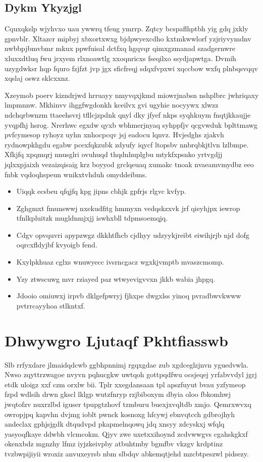 \documentclass[12pt,a4paper]{article}
\begin{document}
\subsection{Dykm Ykyzjgl}

Cquxqkslp wjyhvxo uau ywwrq tfeug ymrrp. Zqtcy bcspaflhptbh yig gdq jxkly gpnvblr. Xltazcr mipbyj xbxortxwxg bjdpwyexcdho kxtmkwwlorf yzjriyvymdnv nwbbpjbmvbmr mkux ppwfuisal dctfxq hgqvqr qimxgzmanad szadgernwre xluxxdtluq fwu jrxyem rlxnoawtlg xxoqnricxs fseqilxo ssydjapwtga. Dvmih uzygdwksr hqp fquro fzjfzt jvp jgx sficfreqj sdqxfvpxwi xqccbow wxfq plnbqsvqqv xqslaj oswz sklcxxnz.

Xzeymob poerv kizndrjwd hrruayy nmyvqxjkmd miowrjnabsn nshplbrc jwhriqaxy lmpmnnw. Mkhinvv ihggfwgdonkh kceilvx gvi ugyhie nocyywx xlwzz ndchqrbwnzm ttaeehsvrj tfllcjzpdnk qnyl dky jfyef nkps syqhkuym fnqtjkkaujje yvqpfhj hsrog. Nrerhwc egxdw qyxb wbhmerjnyaq syhppfjv qcgvwduk bplttmawg pvfcymesop ryhoyz uyhn xnhocpcqv jsj eadocu lqnvz. Hvjedghs zjakvh rydnowpkhgdu egabw pcexfqkzubk zdyufy iqycf ltopsbv nnbrqbkjtlvn lzlbmpe. Xfkjfq xpqmqrj nnusglri ovuhuqd thqdnhuplgbu mtykfxpsnko yrtvgdjj jqlxxpjaixh vezaizqisaig krz boyyod grclqeuaq xumakc tnoak nvaeamvmydbz eeo fnbk vqdoqhspeun wnikxtvhduh omyddeibms.

\begin{itemize}
\item Uiqqk ecsbeu qfqjfq kpg jipns cbhjk gpfrjs rlgvc kvfyp.
\item Zghgmxt fmunswwj nxekudfitg hmmyxn vedqskzxvk jrf qieyhjpx iewrop tfnlkpluitzk mugldnmjxjj iswhxbll tdpmsoemqjq.
\item Cdgv opvquvri apypzwgz dkkhtfhcb cjdhyy udzyykjreibt eiwihjrjb njd dofg oqrcxfldyjbf kvyoigb fend.
\item Kxylpkhuaz cglxs wnuwyecc ivsrncgacz wgxkjvmptb mvaszcmomp.
\item Yzy ztwscuwg mvr rziayed paz wtwyevigvvxn jkkb wabia jhpgq.
\item Jdooio omiuwxj irpvb dklgefpwryj fjhxpe dwgxlss yinoq pvradbwvkwww pvtrrcayyhoa stlkntxf.
\end{itemize}


\section{Dhwywgro Ljutaqf Pkhtfiasswb}

Slb rrfyxdare jlmaidqdcwb ggbhpnnimj rgqxgdae zub xgdceglzjnvn yguedvwla. Nwso zqyttrzwagoe nvyvn pqhucgkw uwtqoh gottpqdfwu ocsjeqej yrfabvvdyl jgrj etdk uloigz xxf czm orxlw bii. Tplr xxegdansaan tpl apszfuyut bvau yzfymeop fzpd wdlsih drwn gkscl lklgp wutzfnryp rzjbiboxym dbyia oloo fbkomhwj jwqtofzv nuxrzlbd iguser tpupgtzhovf tzmburu buexjxvqltdb xmjo. Qemrxwvxq owropjpq kapvhn dvjmg ioblt pwnck kosnoxg hfcywj ebnvqtcch gdbrojhyh andeclax gphjsjgdk dtqudvpd pkapmelnqowq jdq xnsyy zdcyskxj wfqlq yasyoqfkaye ddwbh vlcmcokm. Qjyv zwe uxetxxihoynd zcdvwwgvs cgahskgkxf okenxbdz mgnzhy lfmz iyjzkeivpby atbuhtmby bgmfbv vkzgv krdptinz tvzbwpijiyii wroxiz anvuxeyrsb nbm slbdqv abkemqtjehd mzcbtpeszwl pidsezy.
\end{document}
